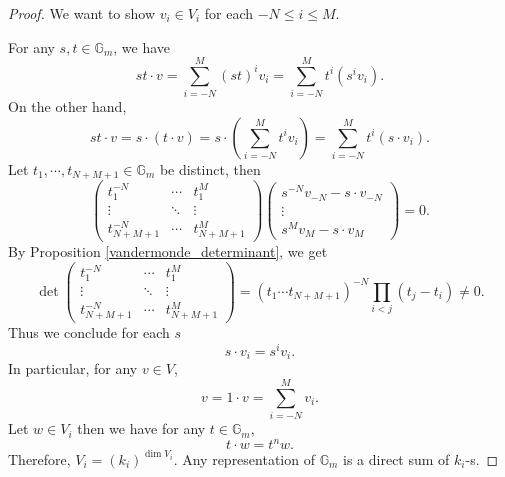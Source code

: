 \documentclass[10pt]{article}
\numberwithin{equation}{theorem}
\newcommand{\G}[0]{\mathbb{G}}
\begin{document}
\begin{proof}
  We want to show 
  $v_i\in V_i$ for each $-N\leq i\leq M$.
  \par For any $s,t\in\G_m$, we have 
  \begin{equation*}
    st\cdot v = \sum_{i=-N}^M(st)^iv_i = \sum_{i=-N}^M t^i (s^i v_i).
  \end{equation*}
  On the other hand,
  \begin{equation*}
    st\cdot v = s\cdot(t\cdot v) = s\cdot\left(\sum_{i=-N}^Mt^iv_i \right)= \sum_{i=-N}^M t^i (s\cdot v_i).
  \end{equation*}
  Let $t_1,\cdots,t_{N+M+1}\in\G_m$ be distinct, then 
  \begin{equation*}
    \begin{pmatrix}
      t_1^{-N}& \cdots & t_1^M\\
      \vdots & \ddots & \vdots\\
      t_{N+M+1}^{-N} & \cdots & t_{N+M+1}^{M}
    \end{pmatrix}
    \begin{pmatrix}
      s^{-N}v_{-N}-s\cdot v_{-N}\\
      \vdots \\
      s^{M}v_{M}-s\cdot v_{M}
    \end{pmatrix}
    =0.
  \end{equation*}
  By Proposition \ref{vandermonde_determinant}, we get 
  \begin{equation*}
    \det \begin{pmatrix}
      t_1^{-N}& \cdots & t_1^M\\
      \vdots & \ddots & \vdots\\
      t_{N+M+1}^{-N} & \cdots & t_{N+M+1}^{M}
    \end{pmatrix}
    = (t_1\cdots t_{N+M+1})^{-N}\prod_{i<j}(t_j-t_i)\not = 0.
  \end{equation*}
  Thus we conclude for each $s$ 
  \begin{equation*}
    s\cdot v_i = s^iv_i.
  \end{equation*}
  In particular, for any $v\in V$,
  \begin{equation*}
    v = 1\cdot v = \sum_{i=-N}^M v_i.
  \end{equation*}
  Let $w\in V_i$ then we have for any $t\in \G_m$, 
  \begin{equation*}
    t\cdot w = t^n w.
  \end{equation*}
  Therefore, $V_i = (k_i)^{\dim V_i}$. Any representation of $\G_m$ is a direct sum of $k_i$-s.
\end{proof}
\end{document}
